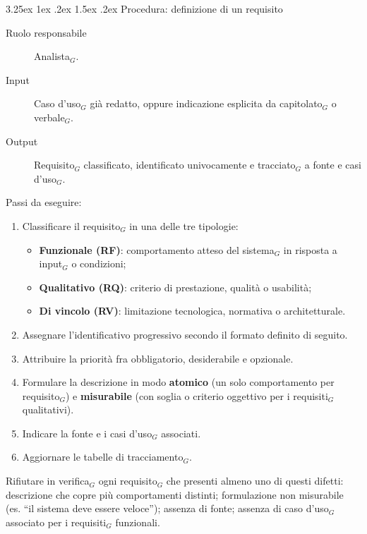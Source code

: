 \documentclass[a4paper, 10pt]{article}
\makeatletter
\renewcommand\paragraph{\@startsection{paragraph}{4}{\z@}%
  {3.25ex \@plus1ex \@minus .2ex}%
  {1.5ex \@plus .2ex}%
  {\normalfont\normalsize\bfseries}}
\makeatother
\begin{document}
\paragraph{Procedura: definizione di un requisito}\label{attivita-requisiti}

\begin{description}
    \item[Ruolo responsabile] Analista$_G$.
    \item[Input] Caso d'uso$_G$ già redatto, oppure indicazione esplicita da capitolato$_G$ o verbale$_G$.
    \item[Output] Requisito$_G$ classificato, identificato univocamente e tracciato$_G$ a fonte e casi d'uso$_G$.
\end{description}

\noindent Passi da eseguire:
\begin{enumerate}
    \item Classificare il requisito$_G$ in una delle tre tipologie:
    \begin{itemize}
        \item \textbf{Funzionale (RF)}: comportamento atteso del sistema$_G$ in risposta a input$_G$ o condizioni;
        \item \textbf{Qualitativo (RQ)}: criterio di prestazione, qualità o usabilità;
        \item \textbf{Di vincolo (RV)}: limitazione tecnologica, normativa o architetturale.
    \end{itemize}
    \item Assegnare l'identificativo progressivo secondo il formato definito di seguito.
    \item Attribuire la priorità fra obbligatorio, desiderabile e opzionale.
    \item Formulare la descrizione in modo \textbf{atomico} (un solo comportamento per requisito$_G$) e \textbf{misurabile} (con soglia o criterio oggettivo per i requisiti$_G$ qualitativi).
    \item Indicare la fonte e i casi d'uso$_G$ associati.
    \item Aggiornare le tabelle di tracciamento$_G$.
\end{enumerate}

\noindent Rifiutare in verifica$_G$ ogni requisito$_G$ che presenti almeno uno di questi difetti: descrizione che copre più comportamenti distinti; formulazione non misurabile (es. ``il sistema deve essere veloce''); assenza di fonte; assenza di caso d'uso$_G$ associato per i requisiti$_G$ funzionali.
\end{document}
